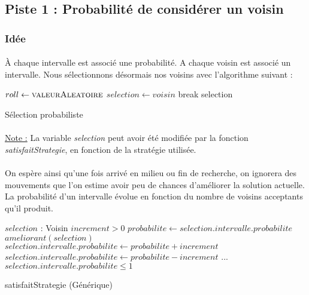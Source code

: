 \documentclass[a4paper,10pt]{report}
\begin{document}
\subsection{Piste 1 : Probabilité de considérer un voisin}
\subsubsection{Idée}

\paragraph{}
À chaque intervalle est associé une probabilité. A chaque voisin est associé un intervalle. Nous sélectionnons
désormais nos voisins avec l'algorithme suivant :

\begin{algorithm}[h]
  \begin{algorithmic}
      \State $roll\gets \Call{valeurAleatoire}{}$
	\State $selection \gets voisin$
	\State break
      \EndIf
    \EndFor
      \Return selection
    \EndIf
  \end{algorithmic}
  \caption{Sélection probabiliste}
\end{algorithm}

\paragraph{}
\underline{Note :} La variable \textit{selection} peut avoir été modifiée par la fonction \textit{satisfaitStrategie},
en fonction de la stratégie utilisée.

\paragraph{}
  On espère ainsi qu'une fois arrivé en milieu ou fin de recherche, on ignorera des mouvements que l'on estime avoir
peu de chances d'améliorer la solution actuelle. La probabilité d'un intervalle évolue en fonction du nombre de
voisins acceptants qu'il produit.

\pagebreak
\begin{algorithm}[h]
  \begin{algorithmic}
    \Require $selection$ : Voisin
    \Require $increment > 0$
    \State 
    \State $probabilite \gets selection.intervalle.probabilite$
    \If $ameliorant(selection)$
      \State $selection.intervalle.probabilite \gets probabilite + increment$
    \Else
      \State $selection.intervalle.probabilite \gets probabilite - increment$
    \EndIf
    \State ...
    \Ensure $selection.intervalle.probabilite \leq 1$
  \end{algorithmic}
  \caption{satisfaitStrategie (Générique)}
\end{algorithm}
\end{document}
